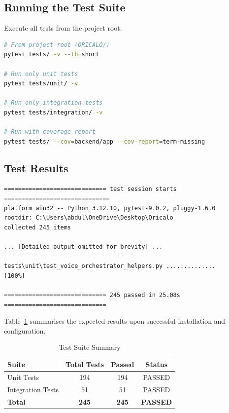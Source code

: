 \subsection{Running the Test Suite}

Execute all tests from the project root:

\begin{lstlisting}[language=bash, caption={Running the Full Test Suite}, label=lst:pytest]
# From project root (ORICALO/)
pytest tests/ -v --tb=short

# Run only unit tests
pytest tests/unit/ -v

# Run only integration tests
pytest tests/integration/ -v

# Run with coverage report
pytest tests/ --cov=backend/app --cov-report=term-missing
\end{lstlisting}

\subsection{Test Results}

\begin{lstlisting}[caption={pytest Results Summary}, label=lst:pytest-results]
============================= test session starts ==============================
platform win32 -- Python 3.12.10, pytest-9.0.2, pluggy-1.6.0
rootdir: C:\Users\abdul\OneDrive\Desktop\Oricalo
collected 245 items                                                                                                                                                   

... [Detailed output omitted for brevity] ...

tests\unit\test_voice_orchestrator_helpers.py ..............                      [100%]

============================= 245 passed in 25.08s =============================
\end{lstlisting}

Table~\ref{tab:test-summary} summarises the expected results upon successful installation and configuration.

\begin{table}[H]
\centering
\caption{Test Suite Summary}
\renewcommand{\arraystretch}{1.2}
\begin{tabular}{|l|c|c|c|}
\hline
\textbf{Suite} & \textbf{Total Tests} & \textbf{Passed} & \textbf{Status} \\ \hline
Unit Tests & 194 & 194 & PASSED \\ \hline
Integration Tests & 51 & 51 & PASSED \\ \hline
\textbf{Total} & \textbf{245} & \textbf{245} & \textbf{PASSED} \\ \hline
\end{tabular}
\label{tab:test-summary}
\end{table}

